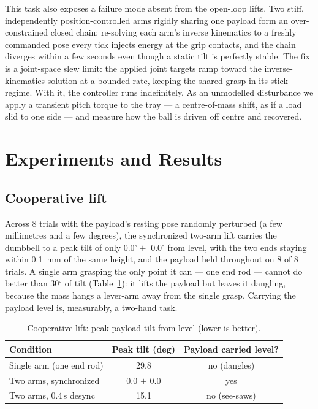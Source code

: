 \documentclass[runningheads]{llncs}
\begin{document}
This task also exposes a failure mode absent from the open-loop lifts. Two stiff, independently position-controlled arms rigidly sharing one payload form an over-constrained closed chain; re-solving each arm's inverse kinematics to a freshly commanded pose every tick injects energy at the grip contacts, and the chain diverges within a few seconds even though a static tilt is perfectly stable. The fix is a joint-space slew limit: the applied joint targets ramp toward the inverse-kinematics solution at a bounded rate, keeping the shared grasp in its stick regime. With it, the controller runs indefinitely. As an unmodelled disturbance we apply a transient pitch torque to the tray --- a centre-of-mass shift, as if a load slid to one side --- and measure how the ball is driven off centre and recovered.

\section{Experiments and Results}
\subsection{Cooperative lift}
Across 8 trials with the payload's resting pose randomly perturbed (a few millimetres and a few degrees), the synchronized two-arm lift carries the dumbbell to a peak tilt of only 0.0$^\circ \pm$ 0.0$^\circ$ from level, with the two ends staying within 0.1~mm of the same height, and the payload held throughout on 8 of 8 trials. A single arm grasping the only point it can --- one end rod --- cannot do better than 30$^\circ$ of tilt (Table~\ref{tab:lift}): it lifts the payload but leaves it dangling, because the mass hangs a lever-arm away from the single grasp. Carrying the payload level is, measurably, a two-hand task.

\begin{table}[t]
\centering
\caption{Cooperative lift: peak payload tilt from level (lower is better).}
\label{tab:lift}
\begin{tabular}{lcc}
\hline
Condition & Peak tilt (deg) & Payload carried level? \\
\hline
Single arm (one end rod) & 29.8 & no (dangles) \\
Two arms, synchronized & 0.0 $\pm$ 0.0 & yes \\
Two arms, 0.4\,s desync & 15.1 & no (see-saws) \\
\hline
\end{tabular}
\end{table}
\end{document}

